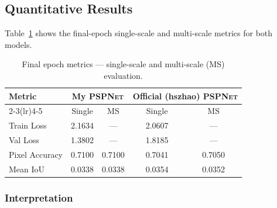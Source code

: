 \documentclass[12pt,a4paper]{article}
\newcommand{\pspnet}{\textsc{PSPNet}}
\newcommand{\mypsp}{My \pspnet{}}
\newcommand{\offpsp}{Official (hszhao) \pspnet{}}
\begin{document}
\subsection{Quantitative Results}

Table~\ref{tab:results} shows the final-epoch single-scale and multi-scale
metrics for both models.

\begin{table}[H]
\centering
\caption{Final epoch metrics — single-scale and multi-scale (MS) evaluation.}
\label{tab:results}
\begin{tabular}{lcccc}
\toprule
\textbf{Metric} & \multicolumn{2}{c}{\textbf{\mypsp{}}} & \multicolumn{2}{c}{\textbf{\offpsp{}}} \\
\cmidrule(lr){2-3}\cmidrule(lr){4-5}
 & Single & MS & Single & MS \\
\midrule
Train Loss       & 2.1634 & ---    & 2.0607 & --- \\
Val Loss         & 1.3802 & ---    & 1.8185 & --- \\
Pixel Accuracy   & 0.7100 & 0.7100 & 0.7041 & 0.7050 \\
Mean IoU         & 0.0338 & 0.0338 & 0.0354 & 0.0352 \\
\bottomrule
\end{tabular}
\end{table}

\subsubsection*{Interpretation}
\end{document}
